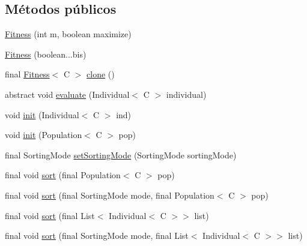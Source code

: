 \subsection*{Métodos públicos}
\begin{DoxyCompactItemize}
\item 
\hyperlink{classjenes_1_1population_1_1_fitness_3_01_c_01extends_01_chromosome_01_4_aba60bd43d62c74ca35946ce9c75bff8f}{Fitness} (int m, boolean maximize)
\item 
\hyperlink{classjenes_1_1population_1_1_fitness_3_01_c_01extends_01_chromosome_01_4_a57836e06b6476c09409f771be28dad74}{Fitness} (boolean...\-bis)
\item 
final \hyperlink{classjenes_1_1population_1_1_fitness_3_01_c_01extends_01_chromosome_01_4_aba60bd43d62c74ca35946ce9c75bff8f}{Fitness}$<$ C $>$ \hyperlink{classjenes_1_1population_1_1_fitness_3_01_c_01extends_01_chromosome_01_4_ab685fe3afbba1f4676d363656bfba81c}{clone} ()
\item 
abstract void \hyperlink{classjenes_1_1population_1_1_fitness_3_01_c_01extends_01_chromosome_01_4_a1e93c0c2af37eb586fe77ad1dc8df761}{evaluate} (Individual$<$ C $>$ individual)
\item 
void \hyperlink{classjenes_1_1population_1_1_fitness_3_01_c_01extends_01_chromosome_01_4_a1b67ac3ad38e0d5ce0ba6a75708a5e2d}{init} (Individual$<$ C $>$ ind)
\item 
void \hyperlink{classjenes_1_1population_1_1_fitness_3_01_c_01extends_01_chromosome_01_4_afc31605de5bbaae2ca16718628c72847}{init} (Population$<$ C $>$ pop)
\item 
final Sorting\-Mode \hyperlink{classjenes_1_1population_1_1_fitness_3_01_c_01extends_01_chromosome_01_4_a8741e8d5e0045bce51edbe0d58b32e0d}{set\-Sorting\-Mode} (Sorting\-Mode sorting\-Mode)
\item 
final void \hyperlink{classjenes_1_1population_1_1_fitness_3_01_c_01extends_01_chromosome_01_4_a99d06b2b20048c7279139381247678c0}{sort} (final Population$<$ C $>$ pop)
\item 
final void \hyperlink{classjenes_1_1population_1_1_fitness_3_01_c_01extends_01_chromosome_01_4_a939407da23b7bfed0f12233a74690e46}{sort} (final Sorting\-Mode mode, final Population$<$ C $>$ pop)
\item 
final void \hyperlink{classjenes_1_1population_1_1_fitness_3_01_c_01extends_01_chromosome_01_4_a966f1a594a9eed5607e27222fd27e696}{sort} (final List$<$ Individual$<$ C $>$$>$ list)
\item 
final void \hyperlink{classjenes_1_1population_1_1_fitness_3_01_c_01extends_01_chromosome_01_4_a3b46414d970cf62539adcd5a3e065268}{sort} (final Sorting\-Mode mode, final List$<$ Individual$<$ C $>$$>$ list)

\end{DoxyCompactItemize}
